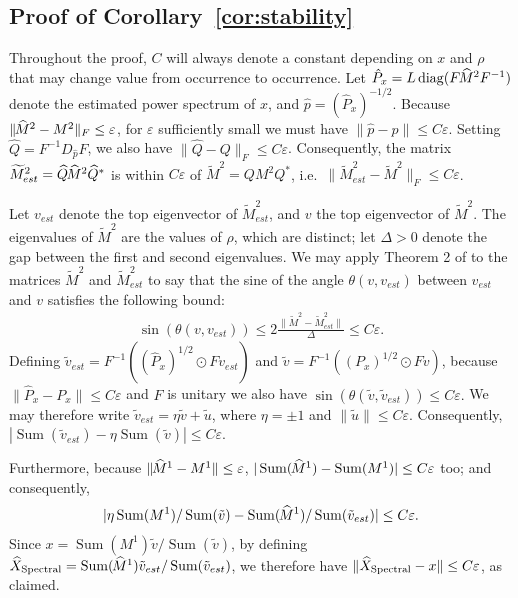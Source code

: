\documentclass{IEEEtran}
\numberwithin{equation}{section}
\numberwithin{figure}{section}
\theoremstyle{plain}
\theoremstyle{definition}
\theoremstyle{remark}
\theoremstyle{plain}
\theoremstyle{remark}
\theoremstyle{plain}
\theoremstyle{plain}
\theoremstyle{remark}
\newcommand{\F}{F}
\newcommand{\hatM}{\widehat{\hspace{-1pt}M}\phantom{\hspace{-11pt}M}}
\DeclareMathOperator*{\diag}{diag}
\begin{document}
\subsection{Proof of Corollary~\ref{cor:stability}} \label{sec:proof_cor_stability}

Throughout the proof, $C$ will always denote a constant depending on $x$ and $\rho$ that may change value from occurrence to occurrence. Let $\hat P_x = L \diag(F \hatM^2 F^{-1})$ denote the estimated power spectrum of $x$, and $\hat p = (\hat P_x)^{-1/2}$. Because $\|\hatM^2 - M^2\|_F \le \varepsilon$, for $\varepsilon$ sufficiently small we must have $\|\hat p - p\| \le C \varepsilon$. Setting $\widehat Q = F^{-1} D_{\hat p} F$, we also have $\|\widehat Q - Q\|_F \le C \varepsilon$. Consequently, the matrix $ \widetilde M_{est}^2 = \widehat Q \hatM^2 \widehat Q^*$ is within $C\varepsilon$ of $\widetilde M^2 = Q M^2 Q^*$, i.e.\ $\|\widetilde M^2_{est} - \widetilde M^2\|_F \le C \varepsilon$.

Let $v_{est}$ denote the top eigenvector of $\widetilde M_{est}^2$, and $v$ the top eigenvector of $\widetilde M^2$. The eigenvalues of $\widetilde M^2$ are the values of $\rho$, which are distinct; let $\Delta > 0$ denote the gap between the first and second eigenvalues. We may apply Theorem 2 of \cite{yu2015useful} to the matrices $\widetilde M^2$ and $\widetilde M_{est}^2$ to say that the sine of the angle $\theta(v,v_{est})$ between $v_{est}$ and $v$ satisfies the following bound:
%
\begin{align}
\sin(\theta(v,v_{est})) \le 2\frac{\|\widetilde M^2 - \widetilde M_{est}^2\|}{\Delta} 
\le C \varepsilon.
\end{align}
%
Defining $\tilde v_{est} = \F^{-1}\left(  (\hat P_x)^{1/2} \odot \F v_{est}  \right)$ and $\tilde v = \F^{-1}\left(  (P_x)^{1/2} \odot \F v  \right)$, because $\|\hat P_x - P_x\| \le C\varepsilon$ and $F$ is unitary we also have 
%
\begin{math}
\sin(\theta(\tilde v,\tilde v_{est})) \le  C \varepsilon.
\end{math}
%
%
We may therefore write $\tilde v_{est} = \eta \tilde v + \tilde u$, where $\eta = \pm 1$ and $\|\tilde u\| \le C \varepsilon$. Consequently, $|\operatorname{Sum}(\tilde v_{est}) - \eta\operatorname{Sum}(\tilde v)| \le C \varepsilon$.

Furthermore, because $\|\hatM^1 - M^1\| \le \varepsilon$, $|\operatorname{Sum}(\hatM^1) - \operatorname{Sum}(M^1)| \le C \varepsilon$ too; and consequently,
%
\begin{align}
|\eta \operatorname{Sum}(M^1) / \operatorname{Sum}(\tilde v) 
- \operatorname{Sum}(\hatM^1) / \operatorname{Sum}(\tilde v_{est})| 
\le C \varepsilon.
\end{align}
%
Since $x=\operatorname{Sum}(M^1) \tilde v/ \operatorname{Sum}(\tilde v)$, by defining $\widehat{X}_{\text{Spectral}} = \operatorname{Sum}(\hatM^1)\tilde v_{est} / \operatorname{Sum}(\tilde v_{est}) $, we therefore have $\| \widehat{X}_{\text{Spectral}} -\nobreak x\| \le\nobreak C \varepsilon$, as claimed.
\end{document}
